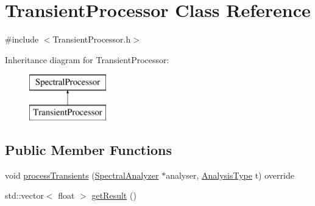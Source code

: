 \hypertarget{class_transient_processor}{\section{Transient\+Processor Class Reference}
\label{class_transient_processor}
}


{\ttfamily \#include $<$Transient\+Processor.\+h$>$}

Inheritance diagram for Transient\+Processor\+:\begin{figure}[H]
\begin{center}
\leavevmode
\includegraphics[height=2.000000cm]{class_transient_processor}
\end{center}
\end{figure}
\subsection*{Public Member Functions}
\begin{DoxyCompactItemize}
\item 
void \hyperlink{class_transient_processor_a66838cd9eb05f0e88360b2afce765dcf}{process\+Transients} (\hyperlink{class_spectral_analyzer}{Spectral\+Analyzer} $\ast$analyser, \hyperlink{_spectral_processor_8h_a7d90861a140b3b6cf1087c5662cf4223}{Analysis\+Type} t) override
\item 
std\+::vector$<$ float $>$ \hyperlink{class_transient_processor_ad51561a7e591bc06f669d19fcf5d02e7}{get\+Result} ()
\end{DoxyCompactItemize}


